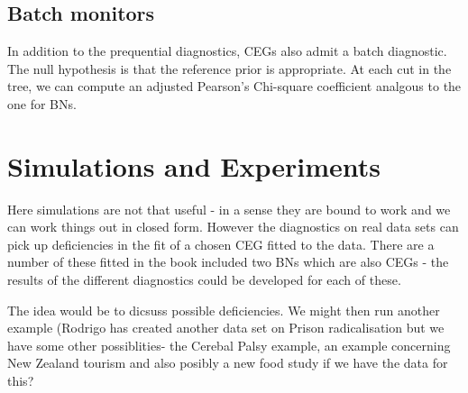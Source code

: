 \documentclass[12pt]{article}
\begin{document}
\subsection{Batch monitors}
In addition to the prequential diagnostics, CEGs also admit a batch diagnostic. The null hypothesis is that the reference prior is appropriate. At each cut in the tree, we can compute an adjusted Pearson's Chi-square coefficient analgous to the one for BNs.
%
%
%

%
%
%

\section{Simulations and Experiments}

Here simulations are not that useful - in a sense they are bound to work and
we can work things out in closed form. However the diagnostics on real data
sets can pick up deficiencies in the fit of a chosen CEG fitted to the data.
There are a number of these fitted in the book included two BNs which are
also CEGs - the results of the different diagnostics could be developed for
each of these. 

The idea would be to dicsuss possible deficiencies. We might
then run another example (Rodrigo has created another data set on Prison
radicalisation but we have some other possiblities- the Cerebal Palsy
example, an example concerning New Zealand tourism and also posibly a new
food study if we have the data for this? 
\end{document}
